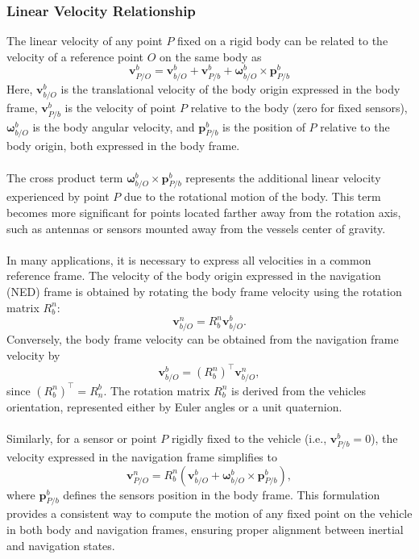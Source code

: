 \subsubsection{Linear Velocity Relationship}
The linear velocity of any point $P$ fixed on a rigid body can be related to the velocity of a reference point $O$ on the same body as
$$
    \mathbf{v}_{P/O}^{b} = \mathbf{v}_{b/O}^{b} + \mathbf{v}_{P/b}^{b} + \boldsymbol{\omega}_{b/O}^{b} \times \mathbf{p}_{P/b}^{b}
$$
Here, $\mathbf{v}_{b/O}^{b}$ is the translational velocity of the body origin expressed in the body frame, $\mathbf{v}_{P/b}^{b}$ is the velocity of point $P$ relative to the body (zero for fixed sensors), $\boldsymbol{\omega}_{b/O}^{b}$ is the body angular velocity, and $\mathbf{p}_{P/b}^{b}$ is the position of $P$ relative to the body origin, both expressed in the body frame.
\\ \\
The cross product term $\boldsymbol{\omega}_{b/O}^{b} \times \mathbf{p}_{P/b}^{b}$ represents the additional linear velocity experienced by point $P$ due to the rotational motion of the body. This term becomes more significant for points located farther away from the rotation axis, such as antennas or sensors mounted away from the vessels center of gravity.
\\ \\
In many applications, it is necessary to express all velocities in a common reference frame. The velocity of the body origin expressed in the navigation (NED) frame is obtained by rotating the body frame velocity using the rotation matrix $R_b^n$:
$$
    \mathbf{v}_{b/O}^{n} = R_b^n \mathbf{v}_{b/O}^{b}.
$$
Conversely, the body frame velocity can be obtained from the navigation frame velocity by
$$
    \mathbf{v}_{b/O}^{b} = (R_b^n)^\top \mathbf{v}_{b/O}^{n},
$$
since $(R_b^n)^\top = R_n^b$. The rotation matrix $R_b^n$ is derived from the vehicles orientation, represented either by Euler angles or a unit quaternion.
\\ \\
Similarly, for a sensor or point $P$ rigidly fixed to the vehicle (i.e., $\mathbf{v}_{P/b}^{b} = 0$), the velocity expressed in the navigation frame simplifies to
$$
 \mathbf{v}_{P/O}^{n} = R_b^n \left(\mathbf{v}_{b/O}^{b} + \boldsymbol{\omega}_{b/O}^{b} \times \mathbf{p}_{P/b}^{b}\right),
$$
where $\mathbf{p}_{P/b}^{b}$ defines the sensors position in the body frame. This formulation provides a consistent way to compute the motion of any fixed point on the vehicle in both body and navigation frames, ensuring proper alignment between inertial and navigation states.



